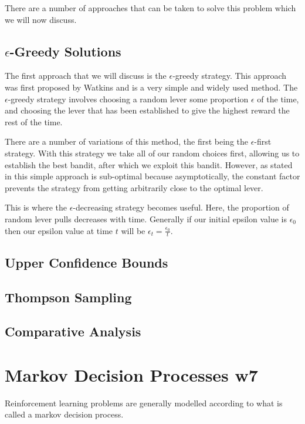 There are a number of approaches that can be taken to solve this problem which we will now discuss.

\subsection{$\epsilon$-Greedy Solutions}\label{subsec:eGreedy}
The first approach that we will discuss is the $\epsilon$-greedy strategy.
This approach was first proposed by Watkins\cite{watkins1989learning} and is a very simple and widely used method.
The $\epsilon$-greedy strategy involves choosing a random lever some proportion $\epsilon$ of the time, and
choosing the lever that has been established to give the highest reward the rest of the time.

There are a number of variations of this method, the first being the $\epsilon$-first strategy.
With this strategy we take all of our random choices first, allowing us to establish the best bandit,
after which we exploit this bandit.
However, as stated in\cite{vermorel2005multi} this simple approach is sub-optimal because asymptotically,
the constant factor prevents the strategy from getting arbitrarily close to
the optimal lever.

This is where the $\epsilon$-decreasing strategy becomes useful.
Here, the proportion of random lever pulls decreases with time.
Generally if our initial epsilon value is $\epsilon_0$ then our epsilon value at time $t$ will be
$\epsilon_t = \frac{\epsilon_0}{t}$.

\subsection{Upper Confidence Bounds}\label{subsec:ucb}

\subsection{Thompson Sampling}\label{subsec:thompsonSampling}

\subsection{Comparative Analysis}\label{subsec:analysis}

\section{Markov Decision Processes w7}\label{sec:mdp}
Reinforcement learning problems are generally modelled according to what is called a markov decision process.

